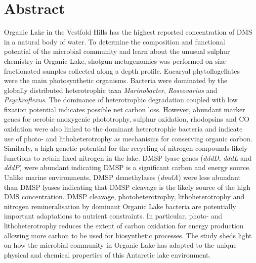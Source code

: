 \section{Abstract}
Organic Lake in the Vestfold Hills has the highest reported concentration of \ac{DMS} in a natural body of water.
To determine the composition and functional potential of the microbial community and learn about the unusual sulphur chemistry in Organic Lake, shotgun metagenomics was performed on size fractionated samples collected along a depth profile.
Eucaryal phytoflagellates were the main photosynthetic organisms.
Bacteria were dominated by the globally distributed heterotrophic taxa \emph{Marinobacter}, \emph{Roseovarius} and \emph{Psychroflexus}.
The dominance of heterotrophic degradation coupled with low fixation potential indicates possible net carbon loss.
However, abundant marker genes for aerobic anoxygenic phototrophy, sulphur oxidation, rhodopsins and CO oxidation were also linked to the dominant heterotrophic bacteria and indicate use of photo- and lithoheterotrophy as mechanisms for conserving organic carbon.
Similarly, a high genetic potential for the recycling of nitrogen compounds likely functions to retain fixed nitrogen in the lake.
\ac{DMSP} lyase genes (\emph{dddD}, \emph{dddL} and \emph{dddP}) were abundant indicating \ac{DMSP} is a significant carbon and energy source.
Unlike marine environments, \ac{DMSP} demethylases (\emph{dmdA}) were less abundant than \ac{DMSP} lyases indicating that \ac{DMSP} cleavage is the likely source of the high \ac{DMS} concentration.
\ac{DMSP} cleavage, photoheterotrophy, lithoheterotrophy and nitrogen remineralisation by dominant Organic Lake bacteria are potentially important adaptations to nutrient constraints.
In particular, photo- and lithoheterotrophy reduces the extent of carbon oxidation for energy production allowing more carbon to be used for biosynthetic processes.
The study sheds light on how the microbial community in Organic Lake has adapted to the unique physical and chemical properties of this Antarctic lake environment.

\newpage

\acresetall
